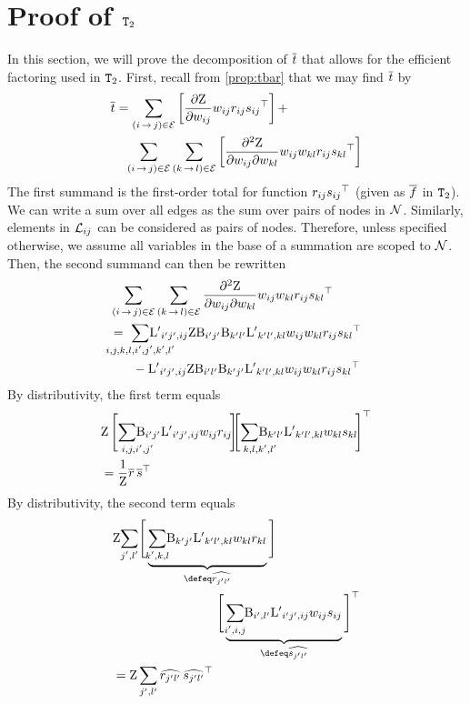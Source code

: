 \documentclass[11pt,a4paper]{article}
\theoremstyle{definition}
\begin{document}
\section{Proof of {\normalfont $\texttt{T}_2$}}\label{app:proof}
In this section, we will prove the decomposition of ${\overline{t}}$ that allows for the efficient factoring used in $\texttt{T}_2$.
First, recall from \cref{prop:tbar} that we may find ${\overline{t}}$ by
\begin{align*}
   {\overline{t}} &= \sum_{{(i\,{\rightarrow}\,j)}\in{\mathcal{E}}}\left[\frac{\partial{\mathrm{Z}}}{\partial {w_{ij}}}{w_{ij}}{r_{ij}}{s_{ij}}^{\top}\right] +  \\
   & \hphantom{=}\sum_{{(i\,{\rightarrow}\,j)}\in{\mathcal{E}}}\sum_{{(k\,{\rightarrow}\,l)}\in{\mathcal{E}}}\left[\frac{\partial^2{\mathrm{Z}}}{\partial {w_{ij}}\partial {w_{kl}}}{w_{ij}}{w_{kl}}{r_{ij}}{s_{kl}}^{\top} \right]
\end{align*}
The first summand is the first-order total for function ${r_{ij}}{s_{ij}}^\top$ (given as ${\overline{f}}$ in $\texttt{T}_2$).
We can write a sum over all edges as the sum over pairs of nodes in ${\mathcal{N}}$.
Similarly, elements in ${\mathcal{L}_{ij}}$ can be considered as pairs of nodes.
Therefore, unless specified otherwise, we assume all variables in the base of a summation are scoped to ${\mathcal{N}}$.
Then, the second summand can then be rewritten
\begin{align*}
    &\sum_{\edgeij\in\edges}\sum_{\edgekl\in\edges}\frac{\partial^2\wbar}{\partial \wedge{ij}\partial \wedge{kl}}\wedge{ij}\wedge{kl}\redge{ij}\sedge{kl}^{\top}  \\
    &= \ \monstersum{i,j,k,l,i',j',k',l'}\dlap{i'j'}{ij}\wbar\cachedelem{i'j'}\cachedelem{k'l'}\dlap{k'l'}{kl}\wedge{ij}\wedge{kl}\redge{ij}\sedge{kl}^{\top} \\
    & \hphantom{\ \monstersum{i,j,k,l}}  - \dlap{i'j'}{ij}\wbar\cachedelem{i'l'}\cachedelem{k'j'}\dlap{k'l'}{kl}\wedge{ij}\wedge{kl}\redge{ij}\sedge{kl}^{\top}
\end{align*}
By distributivity, the first term equals
\begin{align*}
    & \wbar\,\Bigg[ \monstersum{\ \ \ \ \ i,j,i',j'}\cachedelem{i'j'}\dlap{i'j'}{ij}\wedge{ij}\redge{ij} \! \Bigg] \!\! \Bigg[ \monstersum{\ \ \ \ \ k,l,k',l'}\cachedelem{k'l'}\dlap{k'l'}{kl}\wedge{kl}\sedge{kl} \! \Bigg]^\top \\
    &= \frac{1}{\wbar} \rbar\,\sbar^{\top}
\end{align*}
By distributivity, the second term equals
\begin{align*}
    &
    \wbar \monstersum{j',l'}
      \Bigg[\underbrace{\monstersum{k',k,l}
        \cachedelem{k'j'}\dlap{k'l'}{kl}\wedge{kl}\redge{kl}
      }_{\defeq \rhat{j'l'}} \Bigg] \\
     &\hphantom{\wbar\monstersum{j',l'}\monstersum{k',k,l}\cachedelem{k'j'}\dlap{kl}{kl}}
      \Bigg[\underbrace{\monstersum{i',i,j}\cachedelem{i',l'}\dlap{i'j'}{ij}\wedge{ij}\sedge{ij} }_{\defeq \shat{j'l'}} \Bigg]^{\top}
     \\
    &= \wbar\sum_{j',l'}\rhat{j'l'}\,\shat{j'l'}^{\top}
\end{align*}
\end{document}
